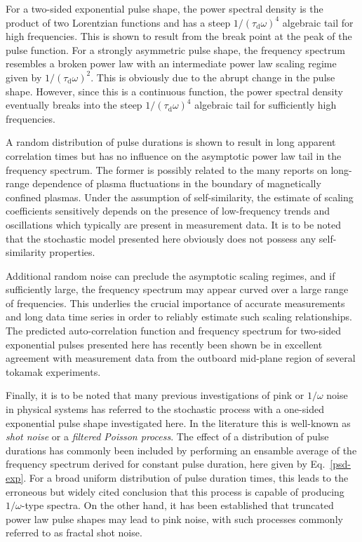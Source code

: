 \documentclass[aps,prb,12pt,a4paper,preprint,amsmath,amssymb,groupedaddress]{revtex4-1}
\newcommand{\taud}{\ensuremath{\tau_\text{d}}}
\newcommand{\Eqref}[1]{Eq.~\eqref{#1}}
\begin{document}
For a two-sided exponential pulse shape, the power spectral density is the product of two Lorentzian functions and has a steep $1/(\taud\omega)^4$ algebraic tail for high frequencies. This is shown to result from the break point at the peak of the pulse function. For a strongly asymmetric pulse shape, the frequency spectrum resembles a broken power law with an intermediate power law scaling regime given by $1/(\taud\omega)^2$. This is obviously due to the abrupt change in the pulse shape. However, since this is a continuous function, the power spectral density eventually breaks into the steep $1/(\taud\omega)^4$ algebraic tail for sufficiently high frequencies.


A random distribution of pulse durations is shown to result in long apparent correlation times but has no influence on the asymptotic power law tail in the frequency spectrum. The former is possibly related to the many reports on long-range dependence of plasma fluctuations in the boundary of magnetically confined plasmas.\cite{pedrosa-prl,carreras-php,rhodes,antar-php1,antar-php2} Under the assumption of self-similarity, the estimate of scaling coefficients sensitively depends on the presence of low-frequency trends and oscillations which typically are present in measurement data. It is to be noted that the stochastic model presented here obviously does not possess any self-similarity properties.


Additional random noise can preclude the asymptotic scaling regimes, and if sufficiently large, the frequency spectrum may appear curved over a large range of frequencies. This underlies the crucial importance of accurate measurements and long data time series in order to reliably estimate such scaling relationships. The predicted auto-correlation function and frequency spectrum for two-sided exponential pulses presented here has recently been shown be in excellent agreement with measurement data from the outboard mid-plane region of several tokamak experiments.\cite{theodorsen-nfl,garcia-nme,theodorsen-ppcf}


Finally, it is to be noted that many previous investigations of pink or $1/\omega$ noise in physical systems has referred to the stochastic process with a one-sided exponential pulse shape investigated here. In the literature this is well-known as \emph{shot noise} or a \emph{filtered Poisson process}.\cite{rice,parzen,pecseli,lowen} The effect of a distribution of pulse durations has commonly been included by performing an ensamble average of the frequency spectrum derived for constant pulse duration, here given by \Eqref{psd-exp}. For a broad uniform distribution of pulse duration times, this leads to the erroneous but widely cited conclusion that this process is capable of producing $1/\omega$-type spectra.\cite{vanziel1,pre,butz,hooge,vanziel2,kogan} On the other hand, it has been established that truncated power law pulse shapes may lead to pink noise, with such processes commonly referred to as fractal shot noise.\cite{lowen}
\end{document}
